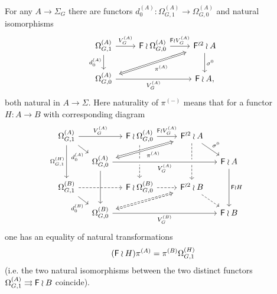\documentclass[a4paper,10pt]{article}%
\begin{document}
\begin{proposition}
For any $A \to \Sigma_G$ there are functors 
$d_0^{(A)}\colon \Omega_{G,1}^{(A)} \to \Omega_{G,0}^{(A)}$ and natural isomorphisms
\begin{equation}\label{SHUFFLEPERMA EQ}
	\begin{tikzcd}
	\Omega_{G,1}^{(A)} \ar{r}{V_G^{(A)}} \ar{d}[swap]{d_{0}^{(A)}}&
	\Fin \wr \Omega_{G,0}^{(A)} \ar{r}{\Fin \wr V_G^{(A)}} &
	|[alias=FFOmega]|\Fin^{\wr 2} \wr A \ar{d}{\sigma^0}
\\
	|[alias=Omega]|\Omega_{G,0}^{(A)} \ar{rr}[swap]{V_G^{(A)}} &&
	\Fin \wr A,
	\arrow[Leftrightarrow, from=FFOmega, to=Omega,shorten <=0.15cm,,shorten >=0.15cm,"\pi^{(A)}"]
	\end{tikzcd}
\end{equation}
both natural in $A \to \Sigma$.
Here naturality of $\pi^{(\minus)}$ means that for a functor $H \colon A \to B$ with corresponding diagram
\begin{equation}\label{PICUBOIDAB EQ}
\begin{tikzcd}[column sep = small, row sep = small]
	\Omega_{G,1}^{(A)} \ar{rr}{V_G^{(A)}} \ar{rd}[swap,near end]{d^{(A)}_0} \ar{dd}[swap]{\Omega_{G,1}^{(H)}}
	&&
	\Fin \wr \Omega_{G,0}^{(A)} \ar{rr}{\Fin \wr V_G^{(A)}} \ar[dd,dashed]&&
	|[alias=FFOmegan]|\Fin^{\wr 2} \wr A  \ar[dd,dashed] \ar{rd}{\sigma^0}
\\
	&
	|[alias=Omeganp1]|\Omega_{G,0}^{(A)} \ar[crossing over]{rrrr}[swap]{V_G^{(A)}} \ar[crossing over]{dd} &&&&
	\Fin \wr A \ar{dd}{\Fin \wr H}&
\\
	\Omega_{G,1}^{(B)} \ar[dashed]{rr} \ar{rd}[swap,near end]{d^{(B)}_0}&&
	\Fin \wr \Omega^{(B)}_{G,0} \ar[rr,dashed] &&
	|[alias=FFOmeganm1]| \Fin^{\wr 2} \wr B \ar[rd,dashed] 
\\
	&
	|[alias=Omegan]|\Omega^{(B)}_{G,0} \ar{rrrr}[swap]{V_G^{(B)}} &&&&
	\Fin \wr B &
	\arrow[Leftrightarrow, from=Omeganp1, to=FFOmegan,shorten <=0.15cm,shorten >=0.15cm,swap,"\pi^{(A)}"]
	\arrow[Leftrightarrow, from=FFOmeganm1, to=Omegan,shorten <=0.15cm,shorten >=0.15cm,dashed]
\end{tikzcd}
\end{equation}
one has an equality of natural transformations
\[(\mathsf{F} \wr H)\pi^{(A)} = \pi^{(B)}\Omega_{G,1}^{(H)}\]
 (i.e. the two natural isomorphisms between the two distinct functors $\Omega_{G,1}^{(A)} \rightrightarrows \mathsf{F} \wr B$ coincide).
\end{proposition}
\end{document}
